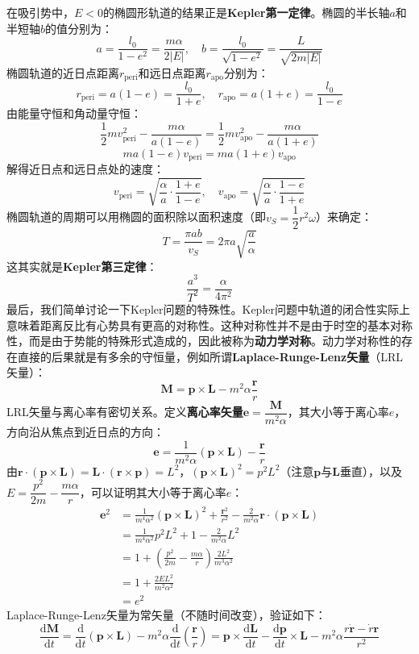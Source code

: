 \documentclass[a4paper,openany]{book}
\begin{document}
在吸引势中，$E<0$的椭圆形轨道的结果正是\textbf{Kepler第一定律}。椭圆的半长轴$a$和半短轴$b$的值分别为：
\[
    \boxed{a = \frac{l_0}{1-e^2} = \frac{m\alpha}{2|E|},\quad b = \frac{l_0}{\sqrt{1-e^2}} = \frac{L}{\sqrt{2m|E|}}}
\]
椭圆轨道的近日点距离$r_{\mathrm{peri}}$和远日点距离$r_{\mathrm{apo}}$分别为：
\[
    r_{\mathrm{peri}} = a(1-e) = \frac{l_0}{1+e},\quad
r_{\mathrm{apo}} = a(1+e) = \frac{l_0}{1-e}
\]
由能量守恒和角动量守恒：
\[
    \frac{1}{2}mv_{\mathrm{peri}}^2 - \frac{m\alpha}{a(1-e)} = \frac{1}{2}mv_{\mathrm{apo}}^2 - \frac{m\alpha}{a(1+e)}
\]
\[
    ma(1-e)v_{\mathrm{peri}} = ma(1+e)v_{\mathrm{apo}}
\]
解得近日点和远日点处的速度：
\[
    v_{\mathrm{peri}} = \sqrt{\frac{\alpha}{a}\cdot\frac{1+e}{1-e}},\quad v_{\mathrm{apo}} = \sqrt{\frac{\alpha}{a}\cdot\frac{1-e}{1+e}}
\]
椭圆轨道的周期可以用椭圆的面积除以面积速度（即$v_S = \dfrac{1}{2}r^2\omega$）来确定：
\[
    T = \frac{\pi ab}{v_S} = 2\pi a\sqrt{\frac{a}{\alpha}}
\]
这其实就是\textbf{Kepler第三定律}：
\[
    \boxed{\frac{a^3}{T^2} = \frac{\alpha}{4\pi^2}}
\]
最后，我们简单讨论一下Kepler问题的特殊性。Kepler问题中轨道的闭合性实际上意味着距离反比有心势具有更高的对称性。这种对称性并不是由于时空的基本对称性，而是由于势能的特殊形式造成的，因此被称为\textbf{动力学对称}。动力学对称性的存在直接的后果就是有多余的守恒量，例如所谓\textbf{Laplace-Runge-Lenz矢量}（LRL矢量）：
\[
    \bm{M} = \bm{p}\times\bm{L} - m^2\alpha\frac{\bm{r}}{r}
\]
LRL矢量与离心率有密切关系。定义\textbf{离心率矢量}$\bm{e} = \dfrac{\bm{M}}{m^2\alpha}$，其大小等于离心率$e$，方向沿从焦点到近日点的方向：
\[
    \bm{e} = \frac{1}{m^2\alpha}(\bm{p}\times\bm{L}) - \frac{\bm{r}}{r}
\]
由$\bm{r}\cdot(\bm{p}\times\bm{L}) = \bm{L}\cdot(\bm{r}\times\bm{p}) = L^2$，$(\bm{p}\times\bm{L})^2 = p^2 L^2$（注意$\bm{p}$与$\bm{L}$垂直），以及$E = \dfrac{p^2}{2m} - \dfrac{m\alpha}{r}$，可以证明其大小等于离心率$e$：
\begin{align*}
    \bm{e}^2
    &= \frac{1}{m^4 \alpha^2}(\bm{p}\times\bm{L})^2 + \frac{\bm{r}^2}{r^2} - \frac{2}{m^2 \alpha}\bm{r}\cdot(\bm{p}\times\bm{L}) \\
    &= \frac{1}{m^4 \alpha^2}p^2 L^2 + 1 - \frac{2}{m^2 \alpha}L^2 \\
    &= 1 + \left(\frac{p^2}{2m} - \frac{m\alpha}{r}\right)\frac{2L^2}{m^3 \alpha^2} \\
    &= 1 + \frac{2EL^2}{m^2\alpha^2} \\
    &= e^2
\end{align*}
Laplace-Runge-Lenz矢量为常矢量（不随时间改变），验证如下：
\[
    \frac{\mathrm{d}\bm{M}}{\mathrm{d}t}
= \frac{\mathrm{d}}{\mathrm{d}t}(\bm{p}\times\bm{L}) - m^2\alpha\frac{\mathrm{d}}{\mathrm{d}t}\left(\frac{\bm{r}}{r}\right)
= \bm{p}\times\frac{\mathrm{d}\bm{L}}{\mathrm{d}t} - \frac{\mathrm{d}\bm{p}}{\mathrm{d}t}\times\bm{L} - m^2\alpha\frac{r\dot{\bm{r}} - \dot{r}\bm{r}}{r^2}
\]
\end{document}
